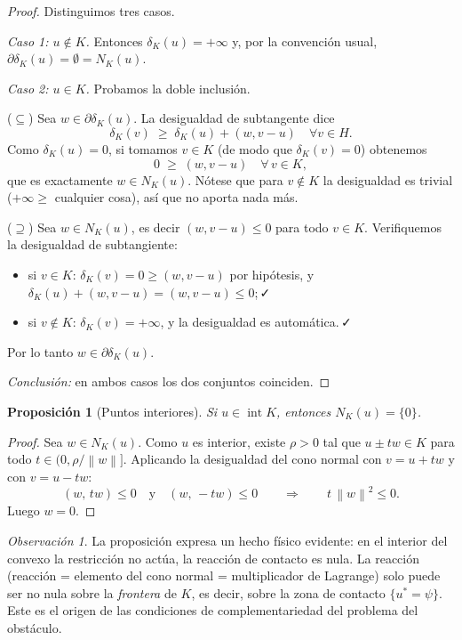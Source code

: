 \documentclass[11pt,a4paper]{article}
\newtheorem{proposicion}[teorema]{Proposición}
\theoremstyle{definition}
\theoremstyle{remark}
\newtheorem{observacion}[teorema]{Observación}
\newcommand{\Norm}[1]{\left\lVert #1 \right\rVert}
\DeclareMathOperator{\inte}{int}
\newcommand{\dk}{\delta_K}
\begin{document}
\begin{proof}
Distinguimos tres casos.

\smallskip
\emph{Caso 1: $u \notin K$.} Entonces $\dk(u) = +\infty$ y, por la convención
usual, $\partial \dk(u) = \emptyset = N_K(u)$.

\smallskip
\emph{Caso 2: $u \in K$.} Probamos la doble inclusión.

($\subseteq$) Sea $w \in \partial\dk(u)$. La desigualdad de subtangente dice
\[
\dk(v) \;\ge\; \dk(u) + (w, v-u) \quad \forall v \in H.
\]
Como $\dk(u) = 0$, si tomamos $v \in K$ (de modo que $\dk(v) = 0$) obtenemos
\[
0 \;\ge\; (w, v - u) \quad \forall\, v \in K,
\]
que es exactamente $w \in N_K(u)$. Nótese que para $v \notin K$ la
desigualdad es trivial ($+\infty \ge$ cualquier cosa), así que no aporta
nada más.

($\supseteq$) Sea $w \in N_K(u)$, es decir $(w, v-u) \le 0$ para todo
$v \in K$. Verifiquemos la desigualdad de subtangiente:
\begin{itemize}
\item si $v \in K$: $\dk(v) = 0 \ge (w, v-u)$ por hipótesis, y
$\dk(u) + (w,v-u) = (w, v-u) \le 0$;\,✓
\item si $v \notin K$: $\dk(v) = +\infty$, y la desigualdad es automática.\,✓
\end{itemize}
Por lo tanto $w \in \partial\dk(u)$.

\smallskip
\emph{Conclusión:} en ambos casos los dos conjuntos coinciden.
\end{proof}

\begin{proposicion}[Puntos interiores]\label{prop:interior}
Si $u \in \inte K$, entonces $N_K(u) = \{0\}$.
\end{proposicion}

\begin{proof}
Sea $w \in N_K(u)$. Como $u$ es interior, existe $\rho > 0$ tal que
$u \pm t w \in K$ para todo $t \in (0, \rho/\Norm{w}]$. Aplicando la
desigualdad del cono normal con $v = u + t w$ y con $v = u - t w$:
\[
(w,\, t w) \le 0 \quad\text{y}\quad (w,\, -t w) \le 0
\qquad\Longrightarrow\qquad
t\,\Norm{w}^2 \le 0 .
\]
Luego $w = 0$.
\end{proof}

\begin{observacion}
La proposición expresa un hecho físico evidente: en el interior del convexo
la restricción no actúa, la reacción de contacto es nula. La reacción
(reacción = elemento del cono normal = multiplicador de Lagrange) solo puede
ser no nula sobre la \emph{frontera} de $K$, es decir, sobre la zona de
contacto $\{u^\ast = \psi\}$. Este es el origen de las condiciones de
complementariedad del problema del obstáculo.
\end{observacion}
\end{document}
